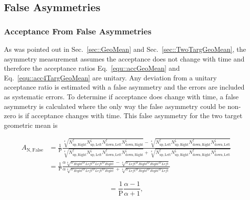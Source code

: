 \subsection{False Asymmetries}
\subsubsection{Acceptance From False Asymmetries}
As was pointed out in Sec.~\ref{sec::GeoMean} and
Sec.~\ref{sec::TwoTargGeoMean}, the asymmetry measurement assumes the acceptance
does not change with time and therefore the acceptance ratios
Eq.~\ref{equ::accGeoMean} and Eq.~\ref{equ::acc4TargGeoMean} are unitary.  Any
deviation from a unitary acceptance ratio is estimated with a false asymmetry
and the errors are included as systematic errors.  To determine if acceptance
does change with time, a false asymmetry is calculated where the only way the
false asymmetry could be non-zero is if acceptance changes with time.  This
false asymmetry for the two target geometric mean is

\begin{equation}
  \label{eqn::falseAcc}
  \begin{split}
    A_{\mathrm{N,False}} &= 
    \frac{1}{\mathrm{P}}
    \frac{
      \sqrt[4]{
        N_{\mathrm{up,Right}}^{\uparrow}N_{\mathrm{up, Left}}^{\downarrow}
        N_{\mathrm{down,Left}}^{\uparrow}N_{\mathrm{down, Right}}^{\downarrow}
      } -
      \sqrt[4]{
        N_{\mathrm{up,Left}}^{\uparrow}N_{\mathrm{up, Right}}^{\downarrow}
        N_{\mathrm{down,Right}}^{\uparrow}N_{\mathrm{down, Left}}^{\downarrow}
      }
    }{
      \sqrt[4]{
        N_{\mathrm{up,Right}}^{\uparrow}N_{\mathrm{up, Left}}^{\downarrow}
        N_{\mathrm{down,Left}}^{\uparrow}N_{\mathrm{down, Right}}^{\downarrow}
      } +
      \sqrt[4]{
        N_{\mathrm{up,Left}}^{\uparrow}N_{\mathrm{up, Right}}^{\downarrow}
        N_{\mathrm{down,Right}}^{\uparrow}N_{\mathrm{down, Left}}^{\downarrow}
      }
    }\\
    & =
    \frac{1}{\mathrm{P}}
    \frac{
      \alpha \sqrt[4]{\sigma_{Right}\sigma_{Left}\sigma_{Left}\sigma_{Right}} -
      \sqrt[4]{\sigma_{Left}\sigma_{Right}\sigma_{Right}\sigma_{Left}}
    }{
      \alpha \sqrt[4]{\sigma_{Right}\sigma_{Left}\sigma_{Left}\sigma_{Right}} +
      \sqrt[4]{\sigma_{Left}\sigma_{Right}\sigma_{Right}\sigma_{Left}}
    }
  \end{split}
\end{equation}

\begin{equation}
  \label{equ::alphaAsym}
  = \frac{1}{\mathrm{P}}
  \frac{
    \alpha - 1     
  }{
    \alpha + 1
  },
\end{equation}

